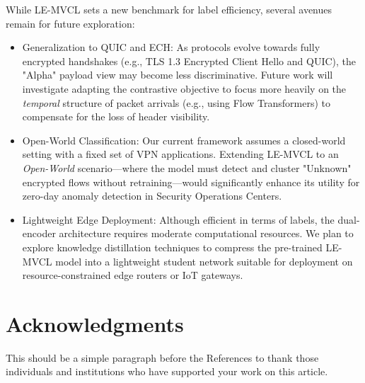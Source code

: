 \documentclass[lettersize,journal]{IEEEtran}
\begin{document}
While LE-MVCL sets a new benchmark for label efficiency, several avenues remain for future exploration:
\begin{itemize}
    \item Generalization to QUIC and ECH: As protocols evolve towards fully encrypted handshakes (e.g., TLS 1.3 Encrypted Client Hello and QUIC), the "Alpha" payload view may become less discriminative. Future work will investigate adapting the contrastive objective to focus more heavily on the \textit{temporal} structure of packet arrivals (e.g., using Flow Transformers) to compensate for the loss of header visibility.
    \item Open-World Classification: Our current framework assumes a closed-world setting with a fixed set of VPN applications. Extending LE-MVCL to an \textit{Open-World} scenario—where the model must detect and cluster "Unknown" encrypted flows without retraining—would significantly enhance its utility for zero-day anomaly detection in Security Operations Centers.
    \item Lightweight Edge Deployment: Although efficient in terms of labels, the dual-encoder architecture requires moderate computational resources. We plan to explore knowledge distillation techniques to compress the pre-trained LE-MVCL model into a lightweight student network suitable for deployment on resource-constrained edge routers or IoT gateways.
\end{itemize}

\section*{Acknowledgments}
This should be a simple paragraph before the References to thank those individuals and institutions who have supported your work on this article.







\end{document}
